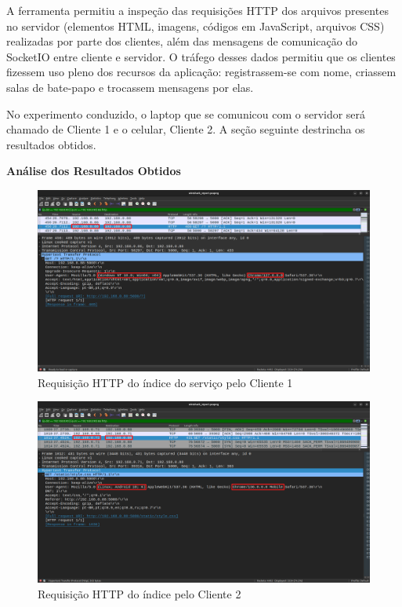 \documentclass[conference,compsoc]{IEEEtran}
\begin{document}
\begin{otherlanguage}{brazil}
A ferramenta permitiu a inspeção das requisições HTTP dos arquivos presentes no servidor (elementos HTML, imagens, códigos em JavaScript, arquivos CSS) realizadas por parte dos clientes, além das mensagens de comunicação do SocketIO entre cliente e servidor. O tráfego desses dados permitiu que os clientes fizessem uso pleno dos recursos da aplicação: registrassem-se com nome, criassem salas de bate-papo e trocassem mensagens por elas.

No experimento conduzido, o laptop que se comunicou com o servidor será chamado de Cliente 1 e o celular, Cliente 2. A seção seguinte destrincha os resultados obtidos.

\textbf{Análise dos Resultados Obtidos}


\begin{figure}[!h]
\centering
\includegraphics[width=\columnwidth]{../media/00-client0_app.png}
\caption{Requisição HTTP do índice do serviço pelo Cliente 1}
\label{fig:client1_request}
\end{figure}

\begin{figure}[!h]
\centering
\includegraphics[width=\columnwidth]{../media/01-client1_app.png}
\caption{Requisição HTTP do índice pelo Cliente 2}
\label{fig:client2_request}
\end{figure}


\end{otherlanguage}
\end{document}
